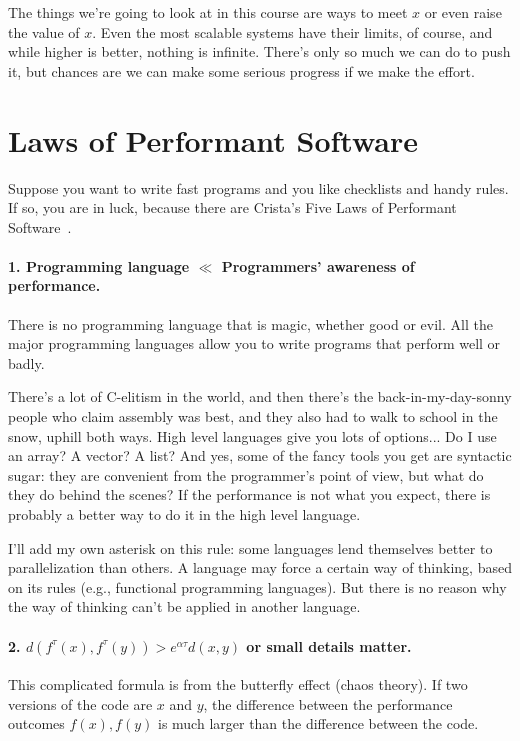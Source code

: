 The things we're going to look at in this course are ways to meet $x$ or even raise the value of $x$. Even the most scalable systems have their limits, of course, and while higher is better, nothing is infinite. There's only so much we can do to push it, but chances are we can make some serious progress if we make the effort.

\section*{Laws of Performant Software}
Suppose you want to write fast programs and you like checklists and handy rules. If so, you are in luck, because there are Crista's Five Laws of Performant Software~\cite{lpsw}. 

\paragraph{1. Programming language $\ll$ Programmers' awareness of performance.}
There is no programming language that is magic, whether good or evil. All the major programming languages allow you to write programs that perform well or badly. 

There's a lot of C-elitism in the world, and then there's the back-in-my-day-sonny people who claim assembly was best, and they also had to walk to school in the snow, uphill both ways. High level languages give you lots of options... Do I use an array? A vector? A list? And yes, some of the fancy tools you get are syntactic sugar: they are convenient from the programmer's point of view, but what do they do behind the scenes? If the performance is not what you expect, there is probably a better way to do it in the high level language.

I'll add my own asterisk on this rule: some languages lend themselves better to parallelization than others. A language may force a certain way of thinking, based on its rules (e.g., functional programming languages). But there is no reason why the way of thinking can't be applied in another language.


\paragraph{2. $d(f^{\tau}(x), f^{\tau}(y)) > e^{\alpha\tau} d(x, y)$ or small details matter.} This complicated formula is from the butterfly effect (chaos theory). If two versions of the code are $x$ and $y$, the difference between the performance outcomes $f(x), f(y)$ is much larger than the difference between the code.

